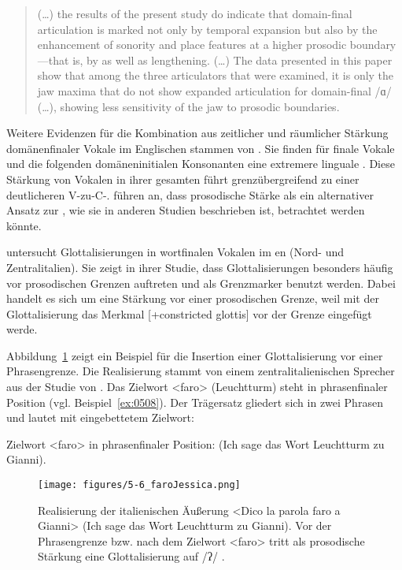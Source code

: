 \begin{quote}
	(\dots) the results of the present study do indicate that domain-final articulation is marked not only by temporal expansion but also by the enhancement of sonority and place features at a higher prosodic boundary—that is, by  as well as lengthening. (\dots) The data presented in this paper show that among the three articulators that were examined, it is only the jaw maxima that do not show expanded articulation for domain-final /ɑ/ (\dots), showing less sensitivity of the jaw to prosodic boundaries. \citep[3876]{Cho2005a}
\end{quote}

Weitere Evidenzen für die Kombination aus zeitlicher und räumlicher Stärkung domänenfinaler Vokale im Englischen stammen von \citet{Fougeron1997}. Sie finden für finale Vokale und die folgenden domäneninitialen Konsonanten eine extremere linguale . Diese Stärkung von Vokalen in ihrer gesamten  führt grenzübergreifend zu einer deutlicheren V-zu-C-. \citet[][3728]{Fougeron1997} führen an, dass prosodische Stärke als ein alternativer Ansatz zur , wie sie in anderen Studien beschrieben ist, betrachtet werden könnte.

\citet{DiNapoli2012} untersucht Glottalisierungen in wortfinalen Vokalen im en (Nord- und Zentralitalien). Sie zeigt in ihrer Studie, dass Glottalisierungen besonders häufig vor prosodischen Grenzen auftreten und als Grenzmarker benutzt werden. Dabei handelt es sich um eine Stärkung vor einer prosodischen Grenze, weil mit der Glottalisierung das Merkmal [+constricted glottis] vor der Grenze eingefügt werde. 

Abbildung~\ref{figure:0506} zeigt ein Beispiel für die Insertion einer Glottalisierung vor einer Phrasengrenze. Die Realisierung stammt von einem zentralitalienischen Sprecher aus der Studie von \citet{DiNapoli2012}. Das Zielwort <faro> (Leuchtturm) steht in phrasenfinaler Position (vgl. Beispiel~\ref{ex:0508}). Der Trägersatz gliedert sich in zwei Phrasen und lautet mit eingebettetem Zielwort:

\begin{exe}
	\ex Zielwort <faro> in phrasenfinaler Position:\label{ex:0508}
	\sn (Ich sage das Wort Leuchtturm zu Gianni).
\end{exe}

\begin{figure}
	\texttt{[image: figures/5-6\_faroJessica.png]}
	\caption{Realisierung der italienischen Äußerung <Dico la parola faro a Gianni> (Ich sage das Wort Leuchtturm zu Gianni). Vor der Phrasengrenze bzw. nach dem Zielwort <faro> tritt als prosodische Stärkung eine Glottalisierung auf /ʔ/ \citep[aus][]{DiNapoli2012}.}
	\label{figure:0506}
\end{figure}

